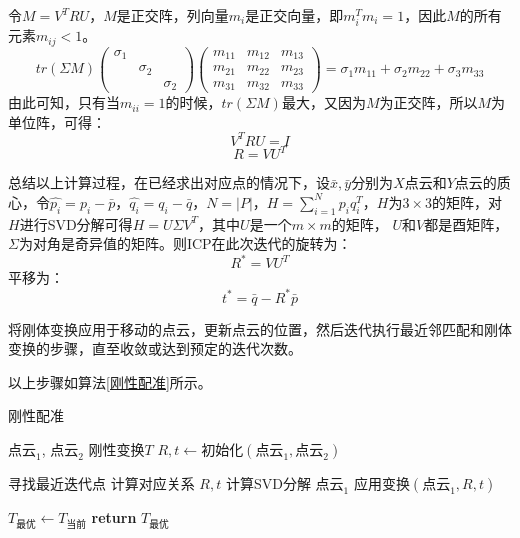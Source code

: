 令$M=V^TRU$，$M$是正交阵，列向量$m_{i}$是正交向量，即$m_i^Tm_i=1$，因此$M$的所有元素$m_{ij}<1$。
\begin{equation}
	tr(\Sigma M)
	\begin{pmatrix}
		\sigma_1  &  &   \\
		&\sigma_2   & \\
		&    &\sigma_2 
	\end{pmatrix}
	\begin{pmatrix}
		m_{11}  &m_{12}   &m_{13}  \\
		m_{21}   &m_{22}   &m_{23}  \\
		m_{31}   &m_{32}   &m_{33} 
	\end{pmatrix}
	= \sigma_1 m_{11} + \sigma_2 m_{22} + \sigma_3 m_{33}
\end{equation}
由此可知，只有当$m_{ii} = 1$的时候，$tr(\Sigma M)$最大，又因为$M$为正交阵，所以$M$为单位阵，可得：
\begin{equation}
	V^TRU = I
\end{equation}
\begin{equation}
	R=VU^T
\end{equation}


总结以上计算过程，在已经求出对应点的情况下，设$\bar{x},\bar{y}$分别为$X$点云和$Y$点云的质心，令$\hat{p_i} = p_i - \bar{p}$，$\hat{q_i} = q_i - \bar{q}$，$N=|P|$，$H=\sum_{i=1}^{N}p_iq_i^T$，$H$为$3\times3$的矩阵，对$H$进行SVD分解可得$H=U\Sigma V^T$，其中$U$是一个$m\times m$的矩阵， $U$和$V$都是酉矩阵，$\Sigma$为对角是奇异值的矩阵。则ICP在此次迭代的旋转为：
\begin{equation}
	\label{旋转公式}
R^* = VU^T
\end{equation}
平移为：
\begin{equation}
	\label{平移公式}
t^* = \bar{q} - R^*\bar{p}
\end{equation}

将刚体变换应用于移动的点云，更新点云的位置，然后迭代执行最近邻匹配和刚体变换的步骤，直至收敛或达到预定的迭代次数。


以上步骤如算法\ref{刚性配准}所示。
\begin{algorithm}[htbp]
	\caption{刚性配准}\label{刚性配准}
	\begin{algorithmic}[1]
		\Require $\text{点云}_1$, $\text{点云}_2$
		\Ensure 刚性变换$T$
		\State {}${R,t} \gets \text{初始化}(\text{点云}_1, \text{点云}_2)$
		
		\State 寻找最近迭代点
		\State 计算对应关系
		\State ${R,t}$  \gets 计算SVD分解
		\State $\text{点云}_1$ \gets 应用变换$(\text{点云}_1, R,t)$
		\EndWhile
		
		\State $T_{\text{最优}} \gets T_{\text{当前}}$
		\State \textbf{return} $T_{\text{最优}}$
	\end{algorithmic}
\end{algorithm}
